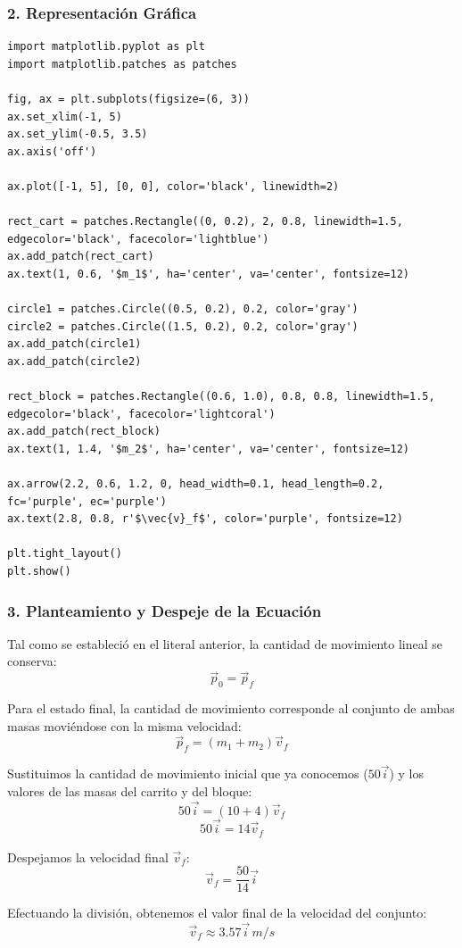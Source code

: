 \documentclass[12pt, a4paper]{article}
\begin{document}
\subsubsection*{2. Representación Gráfica}
\begin{lstlisting}
import matplotlib.pyplot as plt
import matplotlib.patches as patches

fig, ax = plt.subplots(figsize=(6, 3))
ax.set_xlim(-1, 5)
ax.set_ylim(-0.5, 3.5)
ax.axis('off')

ax.plot([-1, 5], [0, 0], color='black', linewidth=2)

rect_cart = patches.Rectangle((0, 0.2), 2, 0.8, linewidth=1.5, edgecolor='black', facecolor='lightblue')
ax.add_patch(rect_cart)
ax.text(1, 0.6, '$m_1$', ha='center', va='center', fontsize=12)

circle1 = patches.Circle((0.5, 0.2), 0.2, color='gray')
circle2 = patches.Circle((1.5, 0.2), 0.2, color='gray')
ax.add_patch(circle1)
ax.add_patch(circle2)

rect_block = patches.Rectangle((0.6, 1.0), 0.8, 0.8, linewidth=1.5, edgecolor='black', facecolor='lightcoral')
ax.add_patch(rect_block)
ax.text(1, 1.4, '$m_2$', ha='center', va='center', fontsize=12)

ax.arrow(2.2, 0.6, 1.2, 0, head_width=0.1, head_length=0.2, fc='purple', ec='purple')
ax.text(2.8, 0.8, r'$\vec{v}_f$', color='purple', fontsize=12)

plt.tight_layout()
plt.show()
\end{lstlisting}

\subsubsection*{3. Planteamiento y Despeje de la Ecuación}
Tal como se estableció en el literal anterior, la cantidad de movimiento lineal se conserva:
\[ \vec{p}_0 = \vec{p}_f \]

Para el estado final, la cantidad de movimiento corresponde al conjunto de ambas masas moviéndose con la misma velocidad:
\[ \vec{p}_f = (m_1 + m_2) \vec{v}_f \]

Sustituimos la cantidad de movimiento inicial que ya conocemos ($50 \vec{i}$) y los valores de las masas del carrito y del bloque:
\[ 50 \vec{i} = (10 + 4) \vec{v}_f \]
\[ 50 \vec{i} = 14 \vec{v}_f \]

Despejamos la velocidad final $\vec{v}_f$:
\[ \vec{v}_f = \frac{50}{14} \vec{i} \]

Efectuando la división, obtenemos el valor final de la velocidad del conjunto:
\[ \vec{v}_f \approx 3.57 \vec{i} \, \si{m/s} \]
\end{document}
